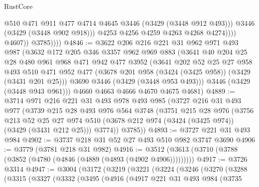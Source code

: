 \begin{lexlean}{RustCore}
\begin{coremodule}
                            @510
                            @471
                            @911
                            @477
                            @4714
                            @4645
                            @3446
                            (@3429 (@3448 @912 @493)))
                          @3446
                          (@3429 (@3448 @902 @918)))
                        @4253
                        @4256
                        @4259
                        @4263
                        @4268
                        @4274))))
                @4607))
            @3785))))
@4846 := @3622
    @206
    @216
    @221
    @31
    @962
    @971
    @493
    @987
    (@3632
      @172
      @205
      @346
      @3357
      @962
      @969
      @883
      (@3641
        @40
        @204
        @25
        @28
        @480
        @961
        @968
        @471
        @942
        @477
        @3952
        (@3641
          @202
          @52
          @25
          @27
          @958
          @493
          @510
          @471
          @952
          @477
          (@3678 @201 @958 (@3424 (@3425 @958)) (@3429 (@3431 @201 @25)))
          @3690
          @3446
          (@3429 (@3448 @953 @493)))
        @3446
        (@3429 (@3448 @943 @961)))
      @4660
      @4663
      @4666
      @4670
      @4675
      @4681)
@4889 := @3714
    @971
    @216
    @221
    @31
    @493
    @978
    @493
    @985
    (@3727
      @216
      @31
      @493
      @977
      (@3739
        @215
        @28
        @493
        @976
        @564
        @3748
        (@3751
          @215
          @28
          @976
          (@3756
            @213
            @52
            @25
            @27
            @974
            @510
            (@3678 @212 @974 (@3424 (@3425 @974)) (@3429 (@3431 @212 @25)))
            @3774))
        @3785))
@4893 := @3727 @221 @31 @493 @984
@4902 := @3737 @218 @31 @52 @27 @493 @510 @982 @3747 @3690
@4906 := @3779 (@3781 @218 @31 @982)
@4916 := @3512 (@3613 (@3710 (@3788 (@3852 (@4780 (@4846 (@4889 (@4893 (@4902 @4906)))))))))
@4917 := @3726 @3314
@4947 := @3004
    (@3172
      (@3219
        (@3221
          (@3224
            (@3246
              (@3270
                (@3288
                  (@3315
                    (@3327
                      (@3332
                        (@3495
                          (@4916
                            (@4917
                              @221
                              @31
                              @493
                              @984
                              (@3735

\end{coremodule}
\end{lexlean}
